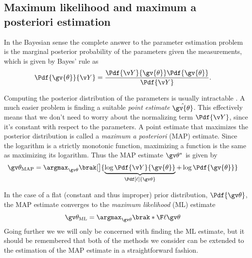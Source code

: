 \subsection{Maximum likelihood and maximum a posteriori estimation}%

In the Bayesian sense the complete answer to the parameter estimation
problem is the marginal posterior probability of the parameters
given the measurements, which is given by Bayes' rule as
\begin{align}
	\Pdf{\gv{\theta}}{\Y}&=\frac{\Pdf{\Y}{\gv{\theta}}\Pdf{\gv{\theta}}}{\Pdf{\Y}}.
	\label{eq:param_post}
\end{align}

Computing the posterior distribution of the parameters is usually intractable . A much
easier problem is finding a suitable \emph{point estimate} $\hat{\gv{\theta}}$.
This effectively means that we don't need to worry about the normalizing
term $\Pdf{\Y}$, since it's constant with respect to the parameters. 
A point estimate that maximizes the posterior distribution
is called a \emph{maximum a posteriori} (MAP) estimate. 
Since the logarithm is a strictly monotonic function, maximizing a function
is the same as maximizing its logarithm. Thus the MAP estimate $\Th^*$ is given by 
\begin{align}
	\Th_{\text{MAP}} &= \argmax_{\Th}\brak[\big]{\underbrace{\log \Pdf{\Y}{\gv{\theta}}}_{\Pdf[\ell]{\Th}} + \log\Pdf{\gv{\theta}}}
	\label{eq:MAP}
\end{align}

In the case of a flat (constant and thus improper)
prior distribution, $\Pdf{\Th}$, the MAP estimate converges to the
\emph{maximum likelihood} (ML) estimate
\begin{align}
	\Th_{\text{ML}} &= \argmax_{\Th}\brak*\lLH
	\label{eq:ML}
\end{align}
Going further we we will only be concerned with finding the ML estimate, but it should
be remembered that both of the methods we consider can be extended
to the estimation of the MAP estimate in a straightforward fashion.

